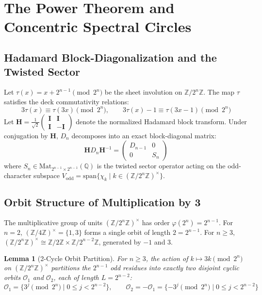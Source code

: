 \documentclass[11pt,reqno]{article}
\theoremstyle{plain}
\newtheorem{lemma}[theorem]{Lemma}
\theoremstyle{definition}
\theoremstyle{remark}
\newcommand{\Z}{\mathbb{Z}}
\newcommand{\Q}{\mathbb{Q}}
\begin{document}
\section{The Power Theorem and Concentric Spectral Circles}

\subsection{Hadamard Block-Diagonalization and the Twisted Sector}

Let $\tau(x) = x + 2^{n-1} \pmod{2^n}$ be the sheet involution on $\Z/2^n\Z$. The map $\tau$ satisfies the deck commutativity relations:
\[
3 \tau(x) \equiv \tau(3x) \pmod{2^n}, \qquad 3 \tau(x) - 1 \equiv \tau(3x - 1) \pmod{2^n}
\]
Let $\mathbf{H} = \frac{1}{\sqrt{2}} \begin{pmatrix} \mathbf{I} & \mathbf{I} \\ \mathbf{I} & -\mathbf{I} \end{pmatrix}$ denote the normalized Hadamard block transform. Under conjugation by $\mathbf{H}$, $D_n$ decomposes into an exact block-diagonal matrix:
\[
\mathbf{H} D_n \mathbf{H}^{-1} = \begin{pmatrix} D_{n-1} & 0 \\ 0 & S_n \end{pmatrix}
\]
where $S_n \in \mathrm{Mat}_{2^{n-1} \times 2^{n-1}}(\Q)$ is the twisted sector operator acting on the odd-character subspace $V_{\mathrm{odd}} = \mathrm{span}\{ \chi_k \mid k \in (\Z/2^n\Z)^\times \}$.

\subsection{Orbit Structure of Multiplication by 3}

The multiplicative group of units $(\Z/2^n\Z)^\times$ has order $\varphi(2^n) = 2^{n-1}$. For $n = 2$, $(\Z/4\Z)^\times = \{1, 3\}$ forms a single orbit of length $2 = 2^{n-1}$. For $n \ge 3$, $(\Z/2^n\Z)^\times \cong \Z/2\Z \times \Z/2^{n-2}\Z$, generated by $-1$ and $3$.

\begin{lemma}[2-Cycle Orbit Partition]
\label{lem:orbit_partition}
For $n \ge 3$, the action of $k \mapsto 3k \pmod{2^n}$ on $(\Z/2^n\Z)^\times$ partitions the $2^{n-1}$ odd residues into exactly two disjoint cyclic orbits $\mathcal{O}_1$ and $\mathcal{O}_2$, each of length $L = 2^{n-2}$:
\[
\mathcal{O}_1 = \{3^j \pmod{2^n} \mid 0 \le j < 2^{n-2}\}, \qquad \mathcal{O}_2 = - \mathcal{O}_1 = \{-3^j \pmod{2^n} \mid 0 \le j < 2^{n-2}\}
\]
\end{lemma}
\end{document}
